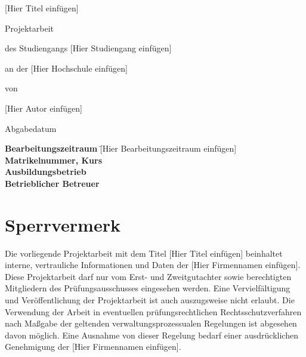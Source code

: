 \documentclass[a4paper, 12pt]{article}
\begin{document}
\begin{titlepage}
    \vspace*{0.5cm}
    \centering
    
    {\Huge [Hier Titel einfügen]\par}
    \vspace{1.5cm}
    {\huge Projektarbeit\par}
    \vspace{1.25cm}
    {\Large des Studiengangs [Hier Studiengang einfügen]\par}
    {\Large an der [Hier Hochschule einfügen]\par}
    \vspace{1cm}
    {\Large von \par}
    {\Large [Hier Autor einfügen] \par}
    \vspace{1cm}
    {\Large Abgabedatum  \par}
    \vspace{3cm}
    {\large
        \begin{tabbing}
            \textbf{Bearbeitungszeitraum} \qquad \qquad \qquad \= [Hier Bearbeitungszeitraum einfügen]\\
            \textbf{Matrikelnummer, Kurs}  \\
            \textbf{Ausbildungsbetrieb}  \\
            \textbf{Betrieblicher Betreuer} 
        \end{tabbing}
    \par}
    \vspace{1cm}
    \vfill
\end{titlepage}

\pagebreak
%
\pagebreak
\section*{Sperrvermerk}
Die vorliegende Projektarbeit mit dem Titel [Hier Titel einfügen] beinhaltet interne, vertrauliche Informationen und Daten der [Hier Firmennamen einfügen].
Diese Projektarbeit darf nur vom Erst- und Zweitgutachter sowie berechtigten Mitgliedern des Prüfungsausschusses eingesehen werden. 
Eine Vervielfältigung und Veröffentlichung der Projektarbeit ist auch auszugsweise nicht erlaubt. 
Die Verwendung der Arbeit in eventuellen prüfungsrechtlichen Rechtsschutzverfahren nach Maßgabe der geltenden verwaltungsprozessualen Regelungen ist abgesehen davon möglich.
Eine Ausnahme von dieser Regelung bedarf einer ausdrücklichen Genehmigung der [Hier Firmennamen einfügen].
\end{document}
